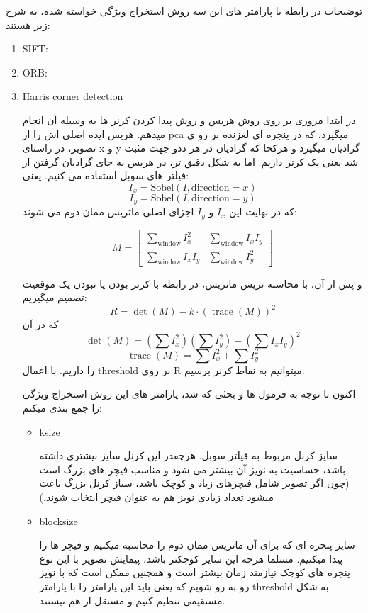 \documentclass[a4paper,12pt]{article}
\begin{document}
توضیحات در رابطه با پارامتر های این سه روش استخراج ویژگی خواسته شده، به شرح زیر هستند:
\begin{enumerate}
	\item SIFT:
	
	\item ORB:
	
	\item Harris corner detection
	
	در ابتدا مروری بر روی روش هریس و روش پیدا کردن کرنر ها به وسیله آن انجام میدهم. هریس ایده اصلی اش را از pca میگیرد، که در پنجره ای لغزنده بر رو ی تصویر، 	در راستای x و y گرادیان میگیرد و هرکجا که گرادیان در هر ددو جهت مثبت شد یعنی یک کرنر داریم. اما به شکل دقیق تر، در هریس به جای گرادیان گرفتن از فیلتر های سوبل استفاده می کنیم. یعنی:
	\[
	I_x = \text{Sobel}(I, \text{direction} = x)
	\]
	\[
	I_y = \text{Sobel}(I, \text{direction} = y)
	\]
	که در نهایت این $I_x$ و $I_y$ اجزای اصلی ماتریس ممان دوم می شوند:
	
	\[
	M =
	\begin{bmatrix}
		\sum_{\text{window}} I_x^2 & \sum_{\text{window}} I_x I_y \\
		\sum_{\text{window}} I_x I_y & \sum_{\text{window}} I_y^2
	\end{bmatrix}
	\]
	
	و پس از آن، با محاسبه تریس ماتریس، در رابطه با کرنر بودن یا نبودن یک موقعیت تصمیم میگیریم:
	\[
	R = \det(M) - k \cdot (\operatorname{trace}(M))^2
	\]
	که در آن
	\[
	\det(M) = (\sum I_x^2)(\sum I_y^2) - (\sum I_x I_y)^2
	\]
	\[
	\operatorname{trace}(M) = \sum I_x^2 + \sum I_y^2
	\]
	را داریم. با اعمال threshold بر روی R میتوانیم به نقاط کرنر برسیم.
	
	اکنون با توجه به فرمول ها و بحثی که شد، پارامتر های این روش استخراج ویژگی را جمع بندی میکنم:
	\begin{itemize}
		\item ksize
		
		سایز کرنل مربوط به فیلتر سوبل. هرچقدر این کرنل سایز بیشتری داشته باشد، حساسیت به نویز آن بیشتر می شود و مناسب فیچر های بزرگ است (چون اگر تصویر شامل فیچرهای زیاد و کوچک باشد، سیاز کرنل بزرگ باعث میشود تعداد زیادی نویز هم به عنوان فیچر انتخاب شوند.)
		\item blocksize
		
		سایز پنجره ای که برای آن ماتریس ممان دوم را محاسبه میکنیم و فیچر ها را پیدا میکنیم. مسلما هرچه این سایز کوچکتر باشد، پیمایش تصویر با این نوع پنجره های کوچک نیازمند زمان بیشتر است و همچنین ممکن است که با نویز رو به رو شویم که یعنی باید این پارامتر را با پارامتر threshold به شکل مستقیمی تنظیم کنیم و مستقل از هم نیستند.
		

\end{itemize}
\end{enumerate}
\end{document}
